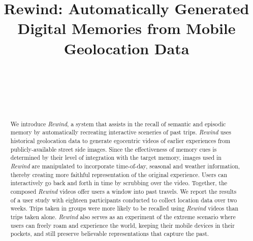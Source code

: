 \documentclass{sigchi}
\begin{document}
\title{Rewind: Automatically Generated\\Digital Memories from Mobile Geolocation Data}

\author{
  \alignauthor {~}\\
    \affaddr{~}\\
    \affaddr{~}\\
    \email{~}\\
}


\maketitle


\begin{abstract}
We introduce \textit{Rewind}, a system that assists in the recall of semantic and episodic memory by automatically recreating interactive sceneries of past trips. \textit{Rewind} uses historical geolocation data to generate egocentric videos of earlier experiences from publicly-available street side images. Since the effectiveness of memory cues is determined by their level of integration with the target memory, images used in \textit{Rewind} are manipulated to incorporate time-of-day, seasonal and weather information, thereby creating more faithful representation of the original experience. Users can interactively go back and forth in time by scrubbing over the video. Together, the composed \textit{Rewind} videos offer users a window into past travels. We report the results of a user study with eighteen participants conducted to collect location data over two weeks. Trips taken in groups were more likely to be recalled using \textit{Rewind} videos than trips taken alone. \textit{Rewind} also serves as an experiment of the extreme scenario where users can freely roam and experience the world, keeping their mobile devices in their pockets, and still preserve believable representations that capture the past.
\end{abstract}
\end{document}
